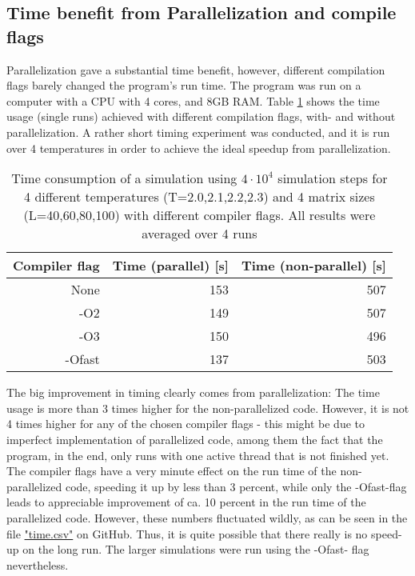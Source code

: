 \documentclass[10pt,a4paper]{article}
\begin{document}
\subsection{Time benefit from Parallelization and compile flags}
Parallelization gave a substantial time benefit, however, different compilation flags barely changed the program's run time. The program was run on a computer with a CPU with 4 cores, and 8GB RAM. Table \ref{Runtime compiler flags} shows the time usage (single runs) achieved with different compilation flags, with- and without parallelization. A rather short timing experiment was conducted, and it is run over 4 temperatures in order to achieve the ideal speedup from parallelization.
\begin{table}[H]
\centering
\caption[Time usage parallel/non-parallel, compilation flags]{Time consumption of a simulation using $4\cdot10^4$ simulation steps for 4 different temperatures (T=2.0,2.1,2.2,2.3) and 4 matrix sizes (L=40,60,80,100) with different compiler flags. All results were averaged over 4 runs}
\centering
\begin{tabular}{|r|r|r|}
\hline
Compiler flag & Time (parallel) [s] & Time (non-parallel) [s] \\ \hline
None             & 153                 & 507                     \\ \hline
-O2              & 149                 & 507                     \\ \hline
-O3              & 150                 & 496                     \\ \hline
-Ofast           & 137                 & 503                     \\ \hline
\end{tabular}\label{Runtime compiler flags}
\end{table}
The big improvement in timing clearly comes from parallelization: The time usage is more than 3 times higher for the non-parallelized code. However, it is not 4 times higher for any of the chosen compiler flags - this might be due to imperfect implementation of parallelized code, among them the fact that the program, in the end, only runs with one active thread that is not finished yet. The compiler flags have a very minute effect on the run time of the non-parallelized code, speeding it up by less than 3 percent, while only the -Ofast-flag leads to appreciable improvement of ca. 10 percent in the run time of the parallelized code. However, these numbers fluctuated wildly, as can be seen in the file \href{https://github.com/adrian2208/FYS3150_collab/blob/master/Project4/selected_results/time.csv}{"time.csv"} on GitHub. Thus, it is quite possible that there really is no speed-up on the long run. The larger simulations were run using the -Ofast- flag nevertheless.
\end{document}

